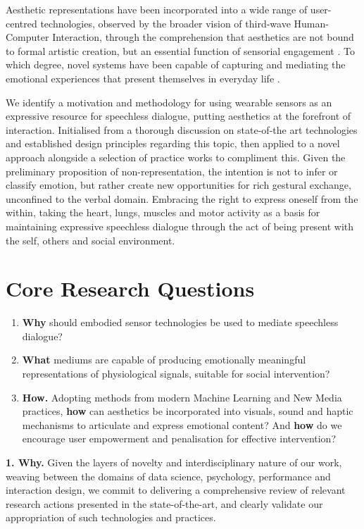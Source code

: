 Aesthetic representations have been incorporated into a wide range of user-centred technologies, observed by the broader vision of third-wave Human-Computer Interaction, through the comprehension that aesthetics are not bound to formal artistic creation, but an essential function of sensorial engagement \cite{bodker2015third}. To which degree, novel systems have been capable of capturing and mediating the emotional experiences that present themselves in everyday life \cite{schiphorst_designing_2020}.

We identify a motivation and methodology for using wearable sensors as an expressive resource for speechless dialogue, putting aesthetics at the forefront of interaction. Initialised from a thorough discussion on state-of-the art technologies and established design principles regarding this topic, then applied to a novel approach alongside a selection of practice works to compliment this. Given the preliminary proposition of non-representation, the intention is not to infer or classify emotion, but rather create new opportunities for rich gestural exchange, unconfined to the verbal domain. Embracing the right to express oneself from the within, taking the heart, lungs, muscles and motor activity as a basis for maintaining expressive speechless dialogue through the act of being present with the self, others and social environment.

\section{Core Research Questions}
\label{sec:research_questions}

\begin{enumerate}
    \item \textbf{Why} should embodied sensor technologies be used to mediate speechless dialogue?
    \item \textbf{What} mediums are capable of producing emotionally meaningful representations of physiological signals, suitable for social intervention?
    \item \textbf{How. } Adopting methods from modern Machine Learning and New Media practices, \textbf{how} can aesthetics be incorporated into visuals, sound and haptic mechanisms to articulate and express emotional content? And \textbf{how} do we encourage user empowerment and penalisation for effective intervention?  
    
\end{enumerate}

\textbf{1. Why.} Given the layers of novelty and interdisciplinary nature of our work, weaving between the domains of data science, psychology, performance and interaction design, we commit to delivering a comprehensive review of relevant research actions presented in the state-of-the-art, and clearly validate our appropriation of such technologies and practices.

